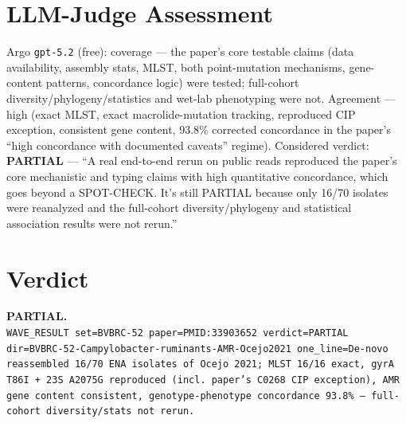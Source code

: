 \documentclass[11pt,a4paper]{article}
\begin{document}
\section{LLM-Judge Assessment}
Argo \texttt{gpt-5.2} (free): coverage --- the paper's core testable claims (data availability, assembly stats, MLST, both point-mutation mechanisms, gene-content patterns, concordance logic) were tested; full-cohort diversity/phylogeny/statistics and wet-lab phenotyping were not. Agreement --- high (exact MLST, exact macrolide-mutation tracking, reproduced CIP exception, consistent gene content, 93.8\% corrected concordance in the paper's ``high concordance with documented caveats'' regime). Considered verdict: \textbf{PARTIAL} --- ``A real end-to-end rerun on public reads reproduced the paper's core mechanistic and typing claims with high quantitative concordance, which goes beyond a SPOT-CHECK. It's still PARTIAL because only 16/70 isolates were reanalyzed and the full-cohort diversity/phylogeny and statistical association results were not rerun.''

\section*{Verdict}
\textbf{PARTIAL.}\\[0.5em]
\texttt{WAVE\_RESULT set=BVBRC-52 paper=PMID:33903652 verdict=PARTIAL dir=BVBRC-52-Campylobacter-ruminants-AMR-Ocejo2021 one\_line=De-novo reassembled 16/70 ENA isolates of Ocejo 2021; MLST 16/16 exact, gyrA T86I + 23S A2075G reproduced (incl.\ paper's C0268 CIP exception), AMR gene content consistent, genotype-phenotype concordance 93.8\% --- full-cohort diversity/stats not rerun.}
\end{document}
